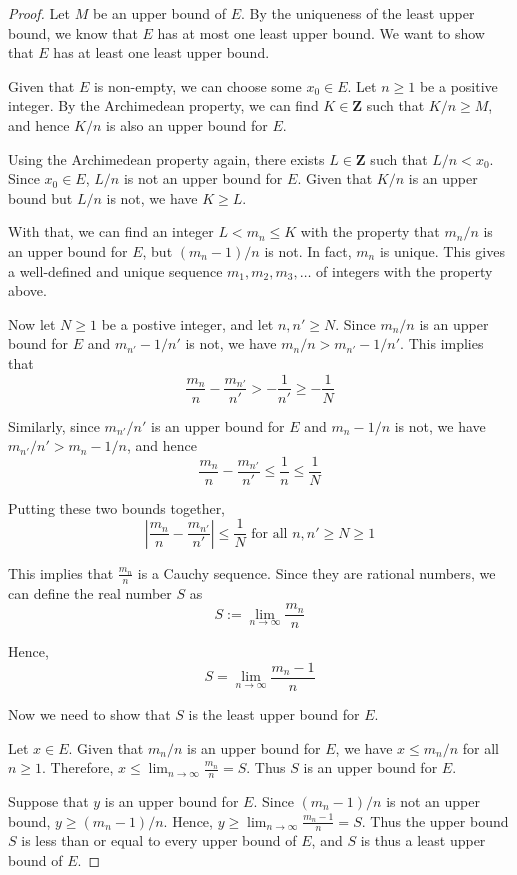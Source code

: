 \documentclass[12pt,a4paper]{article}
\theoremstyle{definition}
\begin{document}
\begin{proof}
  Let $M$ be an upper bound of $E$. By the uniqueness of the least upper bound, we know that $E$ has at most one least upper bound. We want to show that $E$ has at least one least upper bound.

  Given that $E$ is non-empty, we can choose some $x_0 \in E$. Let $n \geq 1$ be a positive integer. By the Archimedean property, we can find $K \in \textbf{Z}$ such that $K/n \geq M$, and hence $K/n$ is also an upper bound for $E$.
  
  Using the Archimedean property again, there exists $L \in \textbf{Z}$ such that $L/n < x_0$. Since $x_0 \in E$, $L/n$ is not an upper bound for $E$. Given that $K/n$ is an upper bound but $L/n$ is not, we have $K \geq L$. 

  With that, we can find an integer $L < m_n \leq K$ with the property that $m_n / n$ is an upper bound for $E$, but $(m_n-1)/n$ is not. In fact, $m_n$ is unique. This gives a well-defined and unique sequence $m_1, m_2, m_3, \ldots$ of integers with the property above. 

  Now let $N \geq 1$ be a postive integer, and let $n, n' \geq N$. Since $m_n/n$ is an upper bound for $E$ and $m_{n'}-1/n'$ is not, we have $m_n/n > m_{n'}-1/n'$. This implies that 
  \[
    \frac{m_n}{n} - \frac{m_{n'}}{n'} > - \frac{1}{n'} \geq - \frac{1}{N}
  \]

  Similarly, since $m_{n'}/n'$ is an upper bound for $E$ and $m_{n}-1/n$ is not, we have $m_{n'}/n' > m_{n}-1/n$, and hence
  \[
    \frac{m_n}{n} - \frac{m_{n'}}{n'} \leq \frac{1}{n} \leq \frac{1}{N}
  \]

  Putting these two bounds together,
  \[
    \left| \frac{m_n}{n} - \frac{m_{n'}}{n'} \right | \leq \frac{1}{N} \text{ for all } n,n' \geq N \geq 1
  \]

  This implies that $\frac{m_n}{n}$ is a Cauchy sequence. Since they are rational numbers, we can define the real number $S$ as
  \[
    S := \lim_{n \to \infty} \frac{m_n}{n}
  \]

  Hence,
  \[
    S = \lim_{n \to \infty} \frac{m_n - 1}{n}
  \]

  Now we need to show that $S$ is the least upper bound for $E$.

  Let $x \in E$. Given that $m_n/n$ is an upper bound for $E$, we have $x \leq m_n/n$ for all $n \geq 1$. Therefore, $x \leq \lim_{n \to \infty} \frac{m_n}{n} = S$. Thus $S$ is an upper bound for $E$.

  Suppose that $y$ is an upper bound for $E$. Since $(m_n - 1)/n$ is not an upper bound, $y \geq (m_n - 1)/n$. Hence, $y \geq \lim_{n \to \infty} \frac{m_n - 1}{n} = S$. Thus the upper bound $S$ is less than or equal to every upper bound of $E$, and $S$ is thus a least upper bound of $E$. 
\end{proof}
\end{document}
